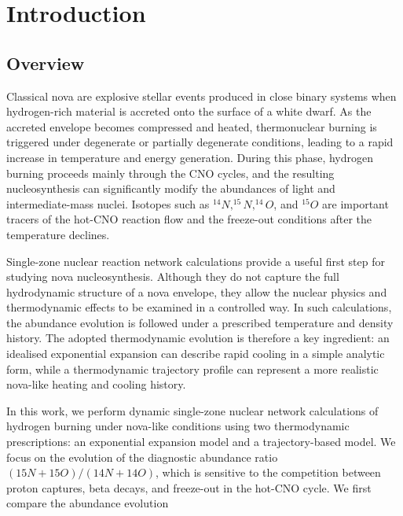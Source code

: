 
\chapter{Introduction} %
\label{Chapter1}


\section{Overview}

Classical nova are explosive stellar events produced in close binary systems when hydrogen-rich material is accreted onto the surface of a white dwarf. As the accreted envelope becomes compressed and heated, thermonuclear burning is triggered under degenerate or partially degenerate conditions, leading to a rapid increase in temperature and energy generation. During this phase, hydrogen burning proceeds mainly through the CNO cycles, and the resulting nucleosynthesis can significantly modify the abundances of light and intermediate-mass nuclei. Isotopes such as $^{14}N, ^{15}N, ^{14}O$, and $^{15}O$ are important tracers of the hot-CNO reaction flow and the freeze-out conditions after the temperature declines.

Single-zone nuclear reaction network calculations provide a useful first step for studying nova nucleosynthesis. Although they do not capture the full hydrodynamic structure of a nova envelope, they allow the nuclear physics and thermodynamic effects to be examined in a controlled way. In such calculations, the abundance evolution is followed under a prescribed temperature and density history. The adopted thermodynamic evolution is therefore a key ingredient: an idealised exponential expansion can describe rapid cooling in a simple analytic form, while a thermodynamic trajectory profile can represent a more realistic nova-like heating and cooling history.

In this work, we perform dynamic single-zone nuclear network calculations of hydrogen burning under nova-like conditions using two thermodynamic prescriptions: an exponential expansion model and a trajectory-based model. We focus on the evolution of the diagnostic abundance ratio $(15N+15O)/(14N+14O)$, which is sensitive to the competition between proton captures, beta decays, and freeze-out in the hot-CNO cycle. We first compare the abundance evolution

